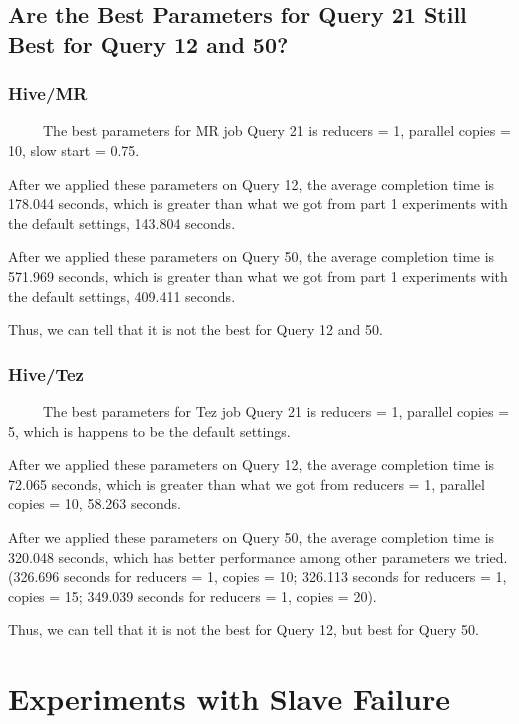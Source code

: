 \documentclass[10pt]{article}
\begin{document}
\subsection{Are the Best Parameters for Query 21 Still Best for Query 12 and 50?}

\subsubsection{Hive/MR}

~~~~~The best parameters for MR job Query 21 is reducers = 1, parallel copies = 10, slow start = 0.75.

After we applied these parameters on Query 12, the average completion time is 178.044 seconds, which is greater than what we got from part 1 experiments with the default settings, 143.804 seconds.

After we applied these parameters on Query 50, the average completion time is 571.969 seconds, which is greater than what we got from part 1 experiments with the default settings, 409.411 seconds.

Thus, we can tell that it is not the best for Query 12 and 50.

\subsubsection{Hive/Tez}

~~~~~The best parameters for Tez job Query 21 is reducers = 1, parallel copies = 5, which is happens to be the default settings.

After we applied these parameters on Query 12, the average completion time is 72.065 seconds, which is greater than what we got from reducers = 1, parallel copies = 10, 58.263 seconds.

After we applied these parameters on Query 50, the average completion time is 320.048 seconds, which has better performance among other parameters we tried. (326.696 seconds for reducers = 1, copies = 10; 326.113 seconds for reducers = 1, copies = 15; 349.039 seconds for reducers = 1, copies = 20).

Thus, we can tell that it is not the best for Query 12, but best for Query 50.


\section{Experiments with Slave Failure}
\end{document}
